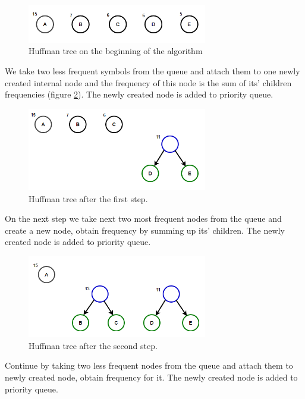 \begin{figure}[!ht]
    \includegraphics[width=0.7\textwidth]{figure/huffman-0.png}
    \caption{Huffman tree on the beginning of the algorithm}
    \label{huffman-0}
\end{figure}

We take two less frequent symbols from the queue and attach them to one newly created internal node and the frequency of this node is the sum of its' children frequencies (figure \ref{huffman-1}). The newly created node is added to priority queue.

\begin{figure}[!ht]
    \includegraphics[width=0.7\textwidth]{figure/huffman-1.png}
    \caption{Huffman tree after the first step.}
    \label{huffman-1}
\end{figure}

On the next step we take next two most frequent nodes from the queue and create a new node, obtain frequency by summing up its' children. The newly created node is added to priority queue.

\begin{figure}[!ht]
    \includegraphics[width=0.7\textwidth]{figure/huffman-2.png}
    \caption{Huffman tree after the second step.}
    \label{huffman-2}
\end{figure}

Continue by taking two less frequent nodes from the queue and attach them to newly created node, obtain frequency for it. The newly created node is added to priority queue.

